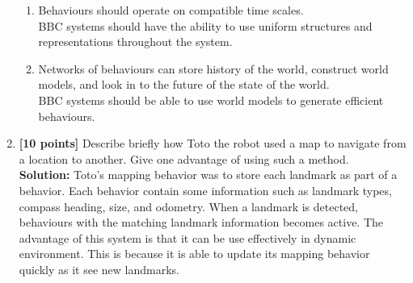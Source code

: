 \documentclass{article}
\begin{document}
\begin{enumerate}
\begin{enumerate}
        \item{Behaviours should operate on compatible time scales.}\\
        BBC systems should have the ability to use uniform structures and representations throughout the system.
		\newline

        \item{Networks of behaviours can store history of the world, construct world models, and look in to the future of the state of the world.}\\
        BBC systems should be able to use world models to generate efficient behaviours.  
        \newline
    \end{enumerate}
\newline

\item \textbf{[10 points]} Describe briefly how Toto the robot used a map to navigate from a location to another. Give one advantage of using such a method.\\

\textbf{Solution:} Toto's mapping behavior was to store each landmark as part of a behavior. Each behavior contain some information such as landmark types, compass heading, size, and odometry. When a landmark is detected, behaviours with the matching landmark information becomes active. 
The advantage of this system is that it can be use effectively in dynamic environment. This is because it is able to update its mapping behavior quickly as it see new landmarks.  
\newline
   
\end{enumerate}
\end{document}
